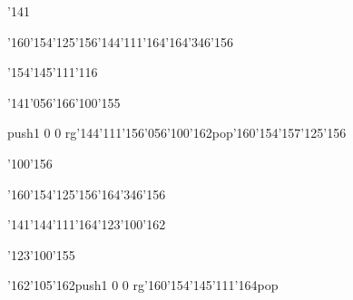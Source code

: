 \null\vfill\ipa\centerline{\enskip\enskip\enskip\enskip\enskip\enskip\enskip\char'141\enskip\enskip\enskip\enskip\enskip}\medskip\centerline{\enskip\char'160\char'154\char'125\char'156\enskip\enskip\enskip\enskip\enskip\enskip\enskip\char'144\char'111\char'164\enskip\enskip\enskip\char'164\char'346\char'156}\medskip\centerline{\enskip\enskip\enskip\enskip\enskip\enskip\enskip\enskip\enskip\enskip\char'154\char'145\char'111\char'116\enskip\enskip\enskip\enskip}\medskip\centerline{\enskip\enskip\enskip\enskip\char'141\char'056\char'166\char'100\char'155\enskip\enskip\enskip\enskip\enskip\enskip}\medskip\centerline{\enskip\enskip\enskip\pdfcolorstack\match push{1 0 0 rg}\char'144\char'111\char'156\char'056\char'100\char'162\pdfcolorstack\match pop{}\enskip\char'160\char'154\char'157\char'125\char'156}\medskip\vfill\footline{\hfil\tt\folio\hfil}\eject
\null\vfill\ipa\centerline{\enskip\enskip\enskip\enskip\char'100\char'156\enskip\enskip\enskip\enskip\enskip\enskip}\medskip\centerline{\enskip\char'160\char'154\char'125\char'156\enskip\enskip\enskip\enskip\enskip\enskip\enskip\enskip\enskip\enskip\enskip\enskip\char'164\char'346\char'156}\medskip\centerline{\enskip\char'141\enskip\enskip\enskip\enskip\char'144\char'111\char'164\enskip\enskip\enskip\enskip\enskip\char'123\char'100\char'162}\medskip\centerline{\enskip\enskip\enskip\enskip\enskip\char'123\char'100\char'155\enskip\enskip\enskip\enskip\enskip\enskip}\medskip\centerline{\enskip\enskip\enskip\char'162\char'105\char'162\enskip\enskip\enskip\enskip\pdfcolorstack\match push{1 0 0 rg}\char'160\char'154\char'145\char'111\char'164\pdfcolorstack\match pop{}}\medskip\vfill\footline{\hfil\tt\folio\hfil}\eject\bye